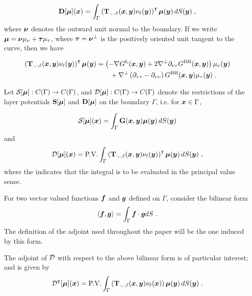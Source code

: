 \begin{equation} \label{eq:doublelayer}
  {\bf D} [{\boldsymbol \mu}] ({\boldsymbol x}) = \int_\Gamma \left ( {\bf T}_{\cdot,\cdot,\ell}({\boldsymbol x},{\boldsymbol y})
  \nu_\ell({\boldsymbol y})\right )^\intercal {\boldsymbol \mu}({\boldsymbol y}) \, dS({\boldsymbol y}) \; ,
\end{equation}
where ${\boldsymbol \nu}$ denotes the outward unit normal to the boundary.
If we write ${\boldsymbol \mu} = {\boldsymbol \nu} \mu_\nu + {\boldsymbol \tau} \mu_\tau$,
where ${\boldsymbol \tau} = {\boldsymbol \nu}^\bot$ is the positively oriented unit
tangent to the curve, then we have

\begin{align} \label{eq:stokesdlkernel}
  \left ( {\bf T}_{\cdot,\cdot,\ell}({\boldsymbol x},{\boldsymbol y})\nu_\ell({\boldsymbol y}) \right )^\intercal
  {\boldsymbol \mu}({\boldsymbol y}) &= \left ( - \nabla G^{\textrm{L}}({\boldsymbol x},{\boldsymbol y}) + 2 \nabla^\bot
  \partial_{\nu\tau} G^{\textrm{BH}}({\boldsymbol x},{\boldsymbol y}) \right ) \mu_\nu({\boldsymbol y}) \nonumber \\
  & \qquad+
  \nabla^\bot \left (\partial_{\tau\tau}-\partial_{\nu\nu} \right )
  G^{\textrm{BH}}({\boldsymbol x},{\boldsymbol y}) \mu_\tau({\boldsymbol y}) \; .
\end{align}

Let ${\mathcal S}[{\boldsymbol \mu}]: C(\Gamma) \to C(\Gamma)$, and
${\mathcal D}[{\boldsymbol \mu}]: C(\Gamma) \to C(\Gamma)$ 
denote the restrictions of the layer potentials 
${\bf S}[{\boldsymbol \mu}]$ and ${\bf D}[{\boldsymbol \mu}]$ on the boundary $\Gamma$, i.e.
for ${\boldsymbol x} \in \Gamma$, 

\begin{equation}
  {\mathcal S} [{\boldsymbol \mu}] ({\boldsymbol x}) = \int_\Gamma {\bf G} ({\boldsymbol x},{\boldsymbol y}) {\boldsymbol \mu}({\boldsymbol y})
  \, dS({\boldsymbol y})
\end{equation}
and
\begin{equation}
\label{eq:dlformula}
  {\mathcal D} [{\boldsymbol \mu}] ({\boldsymbol x}) = \textrm{P.V.} \int_\Gamma \left ( {\bf T}_{\cdot,\cdot,\ell}({\boldsymbol x},{\boldsymbol y})
  \nu_\ell({\boldsymbol y})
  \right )^\intercal {\boldsymbol \mu}({\boldsymbol y}) \, dS({\boldsymbol y}) \; ,
\end{equation}
where the \pv indicates that the integral is to be
evaluated in the principal value sense. 

For two vector valued
functions ${\boldsymbol f}$ and ${\boldsymbol g}$ defined on $\Gamma$, consider the bilinear
form
\begin{equation} \label{eq:bi_form}
  \langle {\boldsymbol f} , {\boldsymbol g} \rangle = \int_\Gamma {\boldsymbol f} \cdot {\boldsymbol g} dS \; .
\end{equation}
The definition of the adjoint used throughout the paper will be
the one induced by this form.


The adjoint of ${\mathcal D}$ with respect to the above bilinear form
is of particular interest; and is given by
\begin{equation}
  {\mathcal D}^{\intercal} [{\boldsymbol \mu}]({\boldsymbol x}) = 
  \textrm{P.V.} \int_\Gamma \left ( {\bf T}_{\cdot,\cdot,\ell}({\boldsymbol x},{\boldsymbol y})\nu_\ell({\boldsymbol x})
  \right ) {\boldsymbol \mu}({\boldsymbol y}) \, dS({\boldsymbol y}) \; .
\end{equation}


